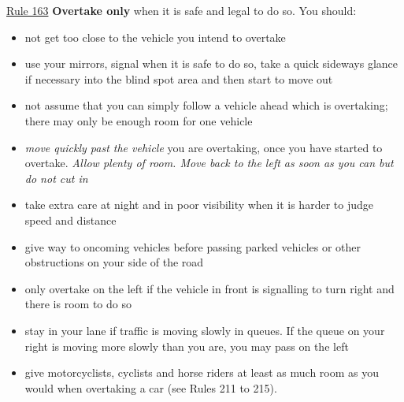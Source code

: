 \noindent\underline{Rule 163}
    \textbf{Overtake only} when it is safe and legal to do so. You should:
    \begin{itemize}
        \item not get too close to the vehicle you intend to overtake
        \item use your mirrors, signal when it is safe to do so, take a quick sideways glance if necessary into the blind spot area and then start to move out
        \item not assume that you can simply follow a vehicle ahead which is overtaking; there may only be enough room for one vehicle
        \item \emph{move quickly past the vehicle} you are overtaking, once you have started to overtake. \emph{Allow plenty of room. Move back to the left as soon as you can but do not cut in}
        \item take extra care at night and in poor visibility when it is harder to judge speed and distance
        \item give way to oncoming vehicles before passing parked vehicles or other obstructions on your side of the road
        \item only overtake on the left if the vehicle in front is signalling to turn right and there is room to do so
        \item stay in your lane if traffic is moving slowly in queues. If the queue on your right is moving more slowly than you are, you may pass on the left
        \item give motorcyclists, cyclists and horse riders at least as much room as you would when overtaking a car (see Rules 211 to 215).
    \end{itemize}


